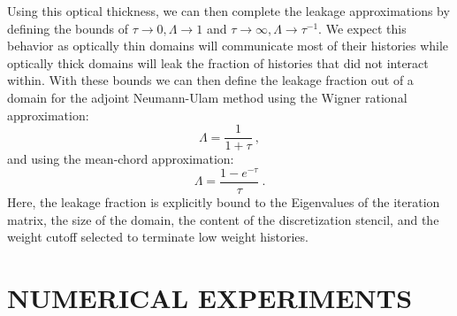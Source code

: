 \documentclass{mc2013}
\begin{document}
Using this optical thickness, we can then complete the leakage
approximations by defining the bounds of $\tau \rightarrow 0, \Lambda
\rightarrow 1$ and $\tau \rightarrow \infty, \Lambda \rightarrow
\tau^{-1}$. We expect this behavior as optically thin domains will
communicate most of their histories while optically thick domains will
leak the fraction of histories that did not interact within. With
these bounds we can then define the leakage fraction out of a domain
for the adjoint Neumann-Ulam method using the Wigner rational
approximation:
\begin{equation}
  \Lambda = \frac{1}{1+\tau}\:,
  \label{eq:wigner_domain_leakage}
\end{equation}
and using the mean-chord approximation:
\begin{equation}
  \Lambda = \frac{1-e^{-\tau}}{\tau}\:.
  \label{eq:mean_chord_domain_leakage}
\end{equation}
Here, the leakage fraction is explicitly bound to the Eigenvalues of
the iteration matrix, the size of the domain, the content of the
discretization stencil, and the weight cutoff selected to terminate
low weight histories.

\section{NUMERICAL EXPERIMENTS}
\label{sec:numerical_experiments}
\end{document}
